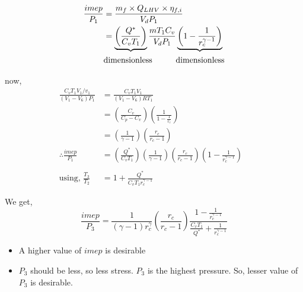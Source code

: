 \documentclass{article}
\begin{document}
\begin{multicols}{2}
		  \begin{align*}
			\frac{imep}{P_1} &= \frac{m_f \times Q_{LHV} \times \eta_{f,i}}{V_d P_1} \\
			&= \underbrace{\left(\frac{Q^*}{C_v T_1}\right)} \frac{m T_1 C_v}{V_d P_1} \underbrace{\left(1 - \frac{1}{r_c^{\gamma -1}}\right)} \\
			& \text{dimensionless} \hspace*{1cm} \text{dimensionless}
		  \end{align*}

		  now, 
		  \begin{align*}
			\frac{C_v T_1 V_1/v_1}{(V_1-V_6) P_1} &= \frac{C_v T_1 V_1}{(V_1-V_6) R T_1} \\
			&= \left(\frac{C_v}{C_p - C_v}\right) \left(\frac{1}{1-\frac{1}{r_c}}\right)\\
			&= \left(\frac{1}{\gamma -1}\right) \left(\frac{r_c}{r_c-1}\right)
			&\\
			\therefore \frac{imep}{P_1} &= \left(\frac{Q^*}{C_v T_1}\right) \left(\frac{1}{\gamma -1}\right) \left(\frac{r_c}{r_c-1}\right) \left(1 - \frac{1}{r_c^{\gamma-1}}\right)\\
			&\\
			\text{using, } \frac{T_3}{T_2} &= 1 + \frac{Q^*}{C_v T_1 r_c^{\gamma -1}}
		  \end{align*}

		  We get,
		  $$\frac{imep}{P_3} = \frac{1}{\left(\gamma -1\right) r_c^\gamma} \left(\frac{r_c}{r_c-1}\right) \frac{1 - \frac{1}{r_c^{\gamma-1}}}{\frac{C_v T_1}{Q^*} + \frac{1}{r_c^{\gamma-1}}}$$

		  \begin{itemize}
			\item A higher value of $imep$ is desirable 
			\item $P_3$ should be less, so less stress. $P_3$ is the highest pressure. So, lesser value of $P_3$ is desirable. 
		  \end{itemize}


\end{multicols}
\end{document}
